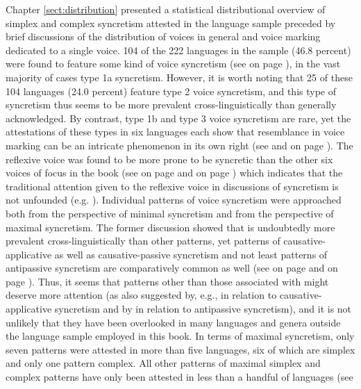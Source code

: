 Chapter \ref{sect:distribution} presented a statistical distributional overview of simplex and complex syncretism attested in the language sample preceded by brief discussions of the distribution of voices in general and voice marking dedicated to a single voice. 104 of the 222 languages in the sample (46.8 percent) were found to feature some kind of voice syncretism (see  on page \pageref{tab:ch6:voice-syncretism}), in the vast majority of cases type 1a syncretism. However, it is worth noting that 25 of these 104 languages (24.0 percent) feature type 2 voice syncretism, and this type of syncretism thus seems to be more prevalent cross-linguistically than generally acknowledged. By contrast, type 1b and type 3 voice syncretism are rare, yet the attestations of these types in six languages each show that resemblance in voice marking can be an intricate phenomenon in its own right (see  and  on page \pageref{tab:ch6:voice-syncretism-type-1}). The reflexive voice was found to be more prone to be syncretic than the other six voices of focus in the book (see  on page \pageref{tab:ch6:voice-syncretism-macroarea-2} and  on page \pageref{fig:ch07:syncretism-diachrony}) which indicates that the traditional attention given to the reflexive voice in discussions of syncretism is not unfounded (e.g. \citealt{geniusiene:1987}). Individual patterns of voice syncretism were approached both from the perspective of minimal syncretism and from the perspective of maximal syncretism. The former discussion showed that  is undoubtedly more prevalent cross-linguistically than other patterns, yet patterns of causative-applicative as well as causative-passive syncretism and not least patterns of antipassive syncretism are comparatively common as well (see  on page \pageref{tab:ch6:voice-syncretism-simplex} and  on page \pageref{ch6:fig:attestations-minimal}). Thus, it seems that patterns other than those associated with  might deserve more attention (as also suggested by, e.g., \citealt{malchukov:2017} in relation to causative-applicative syncretism and by \citealt{janic:2010} in relation to antipassive syncretism), and it is not unlikely that they have been overlooked in many languages and genera outside the language sample employed in this book. In terms of maximal syncretism, only seven patterns were attested in more than five languages, six of which are simplex and only one pattern complex. All other patterns of maximal simplex and complex patterns have only been attested in less than a handful of languages (see 